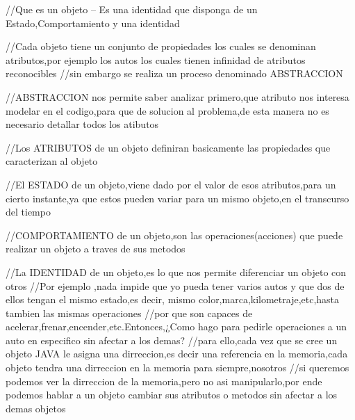 //Que es un objeto -- Es una identidad que disponga de un Estado,Comportamiento y una identidad

//Cada objeto tiene un conjunto de propiedades los cuales se denominan atributos,por ejemplo los autos los cuales tienen infinidad de atributos reconocibles
//sin embargo se realiza un proceso denominado ABSTRACCION

//ABSTRACCION nos permite saber analizar primero,que atributo nos interesa modelar en el codigo,para que de solucion al problema,de esta manera no es necesario detallar todos los atibutos

//Los ATRIBUTOS de un objeto definiran basicamente las propiedades que caracterizan al objeto

//El ESTADO de un objeto,viene dado por el valor de esos atributos,para un cierto instante,ya que estos pueden variar para un mismo objeto,en el transcurso del tiempo

//COMPORTAMIENTO de un objeto,son las  operaciones(acciones) que puede realizar un objeto a traves de sus metodos

//La IDENTIDAD de un objeto,es lo que nos permite diferenciar un objeto con otros
//Por ejemplo ,nada impide que yo pueda tener varios autos y que dos de ellos tengan el mismo estado,es decir, mismo color,marca,kilometraje,etc,hasta tambien las mismas operaciones
//por que son capaces de acelerar,frenar,encender,etc.Entonces,¿Como hago para pedirle operaciones a un auto en especifico sin afectar a los demas?
//para ello,cada vez que se cree un objeto JAVA le asigna una dirreccion,es decir una referencia en la memoria,cada objeto tendra una dirreccion en la memoria para siempre,nosotros 
//si queremos podemos ver la dirreccion de la memoria,pero no asi manipularlo,por ende podemos hablar a un objeto cambiar sus atributos o metodos sin afectar a los demas objetos 

